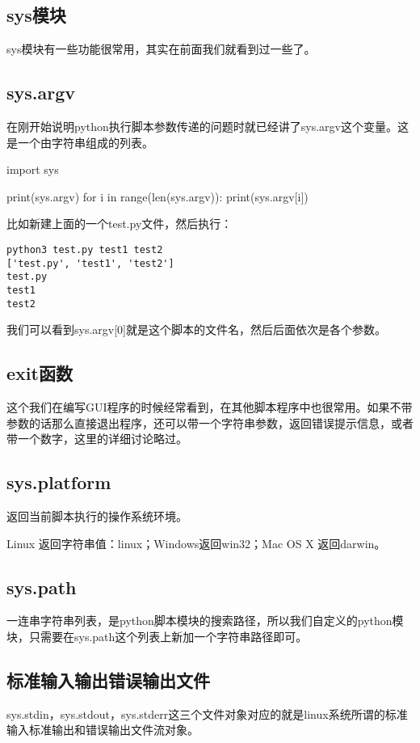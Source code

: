\documentclass[12pt,oneside]{book}
\begin{document}
\begin{common-format}
\chapter{sys模块}
sys模块有一些功能很常用，其实在前面我们就看到过一些了。

\section{sys.argv}
在刚开始说明python执行脚本参数传递的问题时就已经讲了sys.argv这个变量。这是一个由字符串组成的列表。
\begin{tcbpython}
import sys

print(sys.argv)
for i in range(len(sys.argv)):
    print(sys.argv[i])
\end{tcbpython}
比如新建上面的一个test.py文件，然后执行：
\begin{Verbatim}
python3 test.py test1 test2
['test.py', 'test1', 'test2']
test.py
test1
test2
\end{Verbatim}
我们可以看到sys.argv[0]就是这个脚本的文件名，然后后面依次是各个参数。

\section{exit函数}
这个我们在编写GUI程序的时候经常看到，在其他脚本程序中也很常用。如果不带参数的话那么直接退出程序，还可以带一个字符串参数，返回错误提示信息，或者带一个数字，这里的详细讨论略过。


\section{sys.platform}
返回当前脚本执行的操作系统环境。

Linux 返回字符串值：linux；Windows返回win32；Mac OS X 返回darwin。

\section{sys.path}
一连串字符串列表，是python脚本模块的搜索路径，所以我们自定义的python模块，只需要在sys.path这个列表上新加一个字符串路径即可。

\section{标准输入输出错误输出文件}
sys.stdin，sys.stdout，sys.stderr这三个文件对象对应的就是linux系统所谓的标准输入标准输出和错误输出文件流对象。


\end{common-format}
\end{document}
